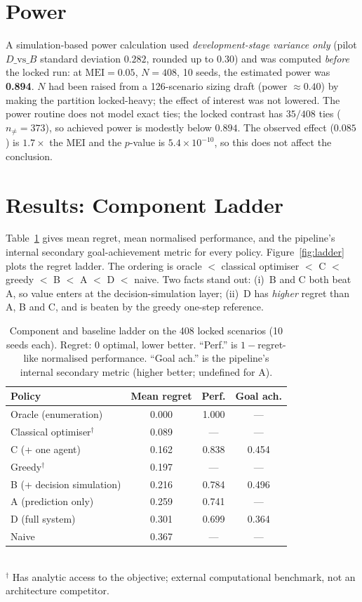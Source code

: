 \documentclass[10pt,twocolumn,a4paper]{article}
\begin{document}
\section{Power}\label{sec:power}
A simulation-based power calculation used \emph{development-stage variance only}
(pilot $D\text{\_vs\_}B$ standard deviation $0.282$, rounded up to $0.30$) and
was computed \emph{before} the locked run: at $\mathrm{MEI}=0.05$, $N=408$,
10 seeds, the estimated power was \textbf{0.894}. $N$ had been raised from a
126-scenario sizing draft (power $\approx0.40$) by making the partition
locked-heavy; the effect of interest was not lowered. The power routine does not
model exact ties; the locked contrast has $35/408$ ties ($n_{\neq}=373$), so
achieved power is modestly below $0.894$. The observed effect ($0.085$) is
$1.7\times$ the MEI and the $p$-value is $5.4\times10^{-10}$, so this does not
affect the conclusion.

\section{Results: Component Ladder}\label{sec:ladder}
Table~\ref{tab:ladder} gives mean regret, mean normalised performance, and the
pipeline's internal secondary goal-achievement metric for every policy.
Figure~\ref{fig:ladder} plots the regret ladder. The ordering is
oracle $<$ classical optimiser $<$ C $<$ greedy $<$ B $<$ A $<$ D $<$ naive.
Two facts stand out: (i)~B and C both beat A, so value enters at the
decision-simulation layer; (ii)~D has \emph{higher} regret than A, B and C, and
is beaten by the greedy one-step reference.

\begin{table}[tbp]
\caption{Component and baseline ladder on the 408 locked scenarios
(10 seeds each). Regret: $0$ optimal, lower better. ``Perf.'' is
$1-$regret-like normalised performance. ``Goal ach.'' is the pipeline's internal
secondary metric (higher better; undefined for A).}
\label{tab:ladder}
\centering
\small
\begin{tabular}{lccc}
\toprule
Policy & Mean regret & Perf. & Goal ach. \\
\midrule
Oracle (enumeration)      & 0.000 & 1.000 & --- \\
Classical optimiser$^\dagger$ & 0.089 & --- & --- \\
C (+ one agent)           & 0.162 & 0.838 & 0.454 \\
Greedy$^\dagger$          & 0.197 & --- & --- \\
B (+ decision simulation) & 0.216 & 0.784 & 0.496 \\
A (prediction only)       & 0.259 & 0.741 & --- \\
D (full system)           & 0.301 & 0.699 & 0.364 \\
Naive                     & 0.367 & --- & --- \\
\bottomrule
\end{tabular}\\[2pt]
{\footnotesize $^\dagger$ Has analytic access to the objective; external
computational benchmark, not an architecture competitor.}
\end{table}
\end{document}
